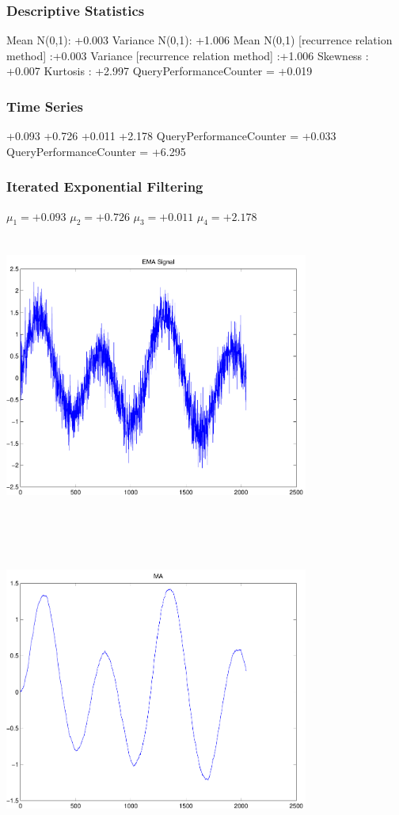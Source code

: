 \documentclass[9pt]{article}
\theoremstyle{plain}
\theoremstyle{definition}
\theoremstyle{remark}
\numberwithin{equation}{section}
\begin{document}
\subsubsection{Descriptive Statistics}
Mean N(0,1): +0.003
Variance N(0,1): +1.006
Mean N(0,1) [recurrence relation method] :+0.003
Variance [recurrence relation method] :+1.006
Skewness : +0.007
Kurtosis : +2.997
QueryPerformanceCounter  =  +0.019
\subsubsection{Time Series }
+0.093
+0.726
+0.011
+2.178
QueryPerformanceCounter  =  +0.033
QueryPerformanceCounter  =  +6.295
\subsubsection{Iterated Exponential Filtering }
$\mu_1 =+0.093$
$\mu_2 =+0.726$
$\mu_3 =+0.011$
$\mu_4 =+2.178$
\includegraphics[width=10.0cm,height=10.0cm]{EMA_signal.pdf}

\includegraphics[width=10.0cm,height=10.0cm]{MA.pdf}
\end{document}
